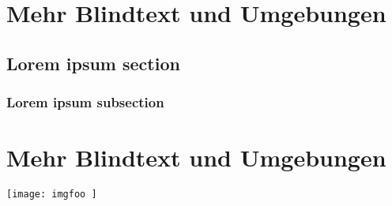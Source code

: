 \usepackage[
T1,
T2=red,
T3=blue
]{
contenc
}


\chapter{
Mehr Blindtext und Umgebungen
}
\section{
Lorem ipsum section
}
\subsection{
Lorem ipsum subsection
}



\chapter{
Mehr Blindtext und Umgebungen
}



\texttt{[image: imgfoo
]}
